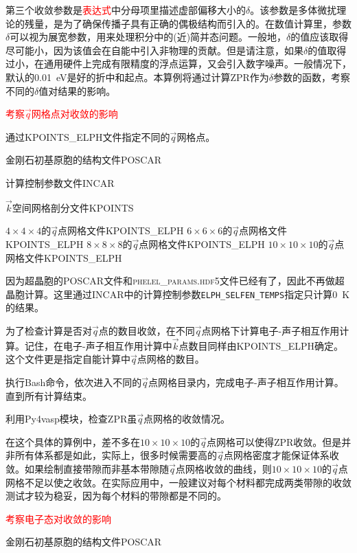 第三个收敛参数是\textcolor{red}{表达式}中分母项里描述虚部偏移大小的$\delta$。该参数是多体微扰理论的残量，是为了确保传播子具有正确的偶极结构而引入的。在数值计算里，参数$\delta$可以视为展宽参数，用来处理积分中的(近)简并态问题。一般地，$\delta$的值应该取得尽可能小，因为该值会在自能中引入非物理的贡献。但是请注意，如果$\delta$的值取得过小，在通用硬件上完成有限精度的浮点运算，又会引入数字噪声。一般情况下，默认的\textrm{0.01~eV}是好的折中和起点。本算例将通过计算\textrm{ZPR}作为$\delta$参数的函数，考察不同的$\delta$值对结果的影响。

\textcolor{red}{考察$\vec q$网格点对收敛的影响}

通过\textrm{KPOINTS\_ELPH}文件指定不同的$\vec q$网格点。

金刚石初基原胞的结构文件\textrm{POSCAR}

计算控制参数文件\textrm{INCAR}

$\vec k$空间网格剖分文件\textrm{KPOINTS}

$4\times4\times4$的$\vec q$点网格文件\textrm{KPOINTS\_ELPH}
$6\times6\times6$的$\vec q$点网格文件\textrm{KPOINTS\_ELPH}
$8\times8\times8$的$\vec q$点网格文件\textrm{KPOINTS\_ELPH}
$10\times10\times10$的$\vec q$点网格文件\textrm{KPOINTS\_ELPH}

因为超晶胞的\textrm{POSCAR}文件和\textsc{phelel\_params.hdf5}文件已经有了，因此不再做超晶胞计算。这里通过\textrm{INCAR}中的计算控制参数\texttt{ELPH\_SELFEN\_TEMPS}指定只计算\textrm{0~K}的结果。

为了检查计算是否对$\vec q$点的数目收敛，在不同$\vec q$点网格下计算电子-声子相互作用计算。记住，在电子-声子相互作用计算中$\vec k$点数目同样由\textrm{KPOINTS\_ELPH}确定。这个文件更是指定自能计算中$\vec q$点网格的数目。

执行\textrm{Bash}命令，依次进入不同的$\vec q$点网格目录内，完成电子-声子相互作用计算。直到所有计算结束。

利用\textrm{Py4vasp}模块，检查\textrm{ZPR}虽$\vec q$点网格的收敛情况。

在这个具体的算例中，差不多在$10\times10\times10$的$\vec q$点网格可以使得\textrm{ZPR}收敛。但是并非所有体系都是如此，实际上，很多时候需要高的$\vec q$点网格密度才能保证体系收敛。如果绘制直接带隙而非基本带隙随$\vec q$点网格收敛的曲线，则$10\times10\times10$的$\vec q$点网格不足以使之收敛。在实际应用中，一般建议对每个材料都完成两类带隙的收敛测试才较为稳妥，因为每个材料的带隙都是不同的。

\textcolor{red}{考察电子态对收敛的影响}

金刚石初基原胞的结构文件\textrm{POSCAR}

